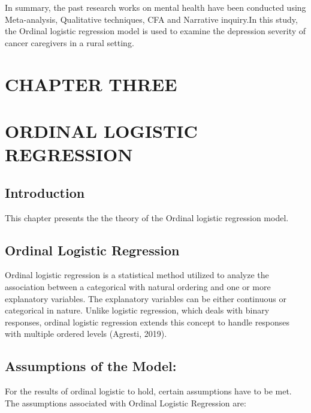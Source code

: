 \documentclass[12pt]{article}\usepackage[]{graphicx}\usepackage[]{xcolor}
\numberwithin{equation}{section}
\numberwithin{figure}{section}
\begin{document}
	\noindent In summary, the past research works on mental health have been conducted using Meta-analysis, Qualitative techniques, CFA and Narrative inquiry.In this study, the Ordinal logistic regression model is used to examine the depression severity of cancer caregivers in a rural setting.
\newpage
\section*{CHAPTER THREE}
\section*{ORDINAL LOGISTIC REGRESSION}
\label{sec:Methodology}
\setcounter{section}{3}
\setcounter{subsection}{0}

\subsection{Introduction}
This chapter presents the the theory of the Ordinal logistic regression model.

\subsection{Ordinal Logistic Regression}

Ordinal logistic regression is a statistical method utilized to analyze the association between a categorical with natural ordering and one or more explanatory variables. The explanatory variables can be either continuous or categorical in nature. Unlike logistic regression, which deals with binary responses, ordinal logistic regression extends this concept to handle responses with multiple ordered levels (Agresti, 2019).

\subsection{Assumptions of the Model:}
For the results of ordinal logistic to hold, certain assumptions have to be met. The assumptions associated with Ordinal Logistic Regression are:
\end{document}
